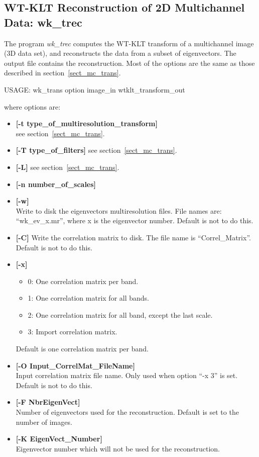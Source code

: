 \subsection{WT-KLT Reconstruction of 2D Multichannel Data: wk\_trec}
The program 
{\em wk\_trec} computes the WT-KLT  transform of 
a multichannel image (3D data set), and reconstructs the data from
a subset of eigenvectors.
The output file contains the reconstruction. Most of the options are the
same as those described in section~\ref{sect_mc_trans}.
{\bf
\begin{center}
 USAGE: wk\_trans option image\_in wtklt\_transform\_out
\end{center}}
where options are: 
\begin{itemize} 
\baselineskip=0.4truecm
\itemsep=0.1truecm

\item {\bf [-t type\_of\_multiresolution\_transform]} \\
see section~\ref{sect_mc_trans}.
\item {\bf [-T type\_of\_filters]}  
see section~\ref{sect_mc_trans}.
\item {\bf [-L]} 
see section~\ref{sect_mc_trans}.
\item {\bf [-n number\_of\_scales]}
\item {\bf [-w]} \\
 Write to  disk the eigenvectors multiresolution files.
File names are: ``wk\_ev\_x.mr'',  where x is the eigenvector number.
Default is not to do this.
\item {\bf [-C]}
Write the correlation matrix to disk. 
The file name is ``Correl\_Matrix''. Default is not to do this.
\item {\bf [-x]} 
{\small
\begin{itemize}       
\baselineskip=0.4truecm
\itemsep=0.1truecm      
\item{0:} One correlation matrix per band. 
\item{1:} One correlation matrix for all bands. 
\item{2:} One correlation matrix for all band, except the last scale. 
\item{3:} Import correlation matrix.
\end{itemize}
Default is one correlation matrix per band.
}             
\item {\bf [-O Input\_CorrelMat\_FileName]} \\
Input correlation matrix file name.
Only used when option ``-x 3'' is set. Default is not to do this.
\item {\bf [-F NbrEigenVect]} \\
Number of eigenvectors used for the reconstruction. 
Default is set to the number of images.
\item {\bf [-K EigenVect\_Number]} \\
Eigenvector number which will not be used for the reconstruction. 
\end{itemize}

